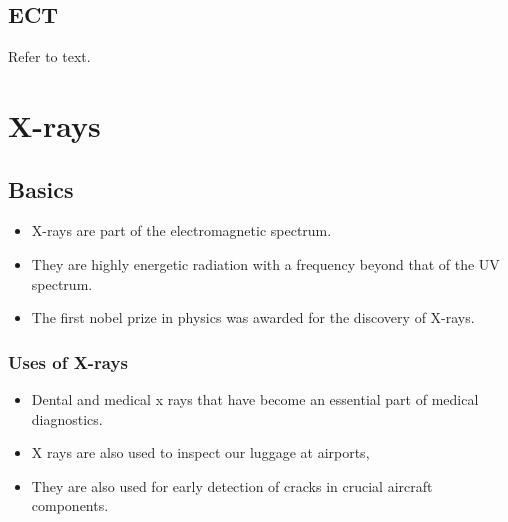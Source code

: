 \documentclass[12pt]{book}
\begin{document}
\section{ECT}
Refer to text.

\chapter{X-rays}
\section{Basics}
\begin{itemize}
	\item X-rays are part of the electromagnetic spectrum.
	\item They are highly energetic radiation with a frequency beyond that of the UV spectrum.
	\item The first nobel prize in physics was awarded for the discovery of X-rays.
\end{itemize}

\subsection{Uses of X-rays}
\begin{itemize}
\item Dental and medical x rays that have become an essential part of medical diagnostics.
\item X rays are also used to inspect our luggage at airports,
\item They are also used for early detection of cracks in crucial aircraft components.
\end{itemize}
\end{document}
